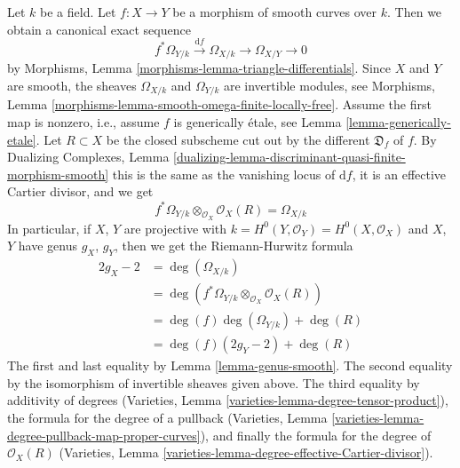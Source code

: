\noindent
Let $k$ be a field. Let $f : X \to Y$ be a morphism of smooth curves over $k$.
Then we obtain a canonical exact sequence
$$
f^*\Omega_{Y/k} \xrightarrow{\text{d}f} \Omega_{X/k}
\longrightarrow \Omega_{X/Y} \longrightarrow 0
$$
by Morphisms, Lemma \ref{morphisms-lemma-triangle-differentials}.
Since $X$ and $Y$ are smooth, the sheaves $\Omega_{X/k}$ and
$\Omega_{Y/k}$ are invertible modules, see
Morphisms, Lemma \ref{morphisms-lemma-smooth-omega-finite-locally-free}.
Assume the first map is nonzero, i.e., assume $f$ is generically
\'etale, see Lemma \ref{lemma-generically-etale}. Let $R \subset X$
be the closed subscheme cut out by the different $\mathfrak{D}_f$ of $f$.
By Dualizing Complexes, Lemma
\ref{dualizing-lemma-discriminant-quasi-finite-morphism-smooth}
this is the same as the vanishing locus of $\text{d}f$, it is
an effective Cartier divisor, and we get
$$
f^*\Omega_{Y/k} \otimes_{\mathcal{O}_X} \mathcal{O}_X(R) = \Omega_{X/k}
$$
In particular, if $X$, $Y$ are projective with
$k = H^0(Y, \mathcal{O}_Y) = H^0(X, \mathcal{O}_X)$
and $X$, $Y$ have genus $g_X$, $g_Y$, then we get the
Riemann-Hurwitz formula
\begin{align*}
2g_X - 2 & =
\deg(\Omega_{X/k}) \\
& =
\deg(f^*\Omega_{Y/k} \otimes_{\mathcal{O}_X} \mathcal{O}_X(R)) \\
& =
\deg(f) \deg(\Omega_{Y/k}) + \deg(R) \\
& =
\deg(f) (2g_Y - 2) + \deg(R)
\end{align*}
The first and last equality by Lemma \ref{lemma-genus-smooth}.
The second equality by the isomorphism of invertible sheaves given above.
The third equality by additivity of degrees
(Varieties, Lemma \ref{varieties-lemma-degree-tensor-product}),
the formula for the degree of a pullback
(Varieties, Lemma \ref{varieties-lemma-degree-pullback-map-proper-curves}),
and finally the formula for the degree of $\mathcal{O}_X(R)$
(Varieties, Lemma \ref{varieties-lemma-degree-effective-Cartier-divisor}).


